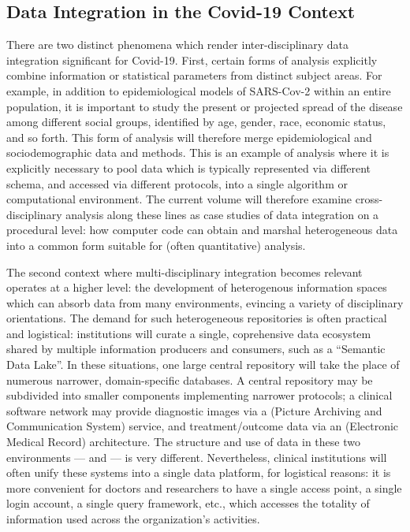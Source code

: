 \documentclass{statsoc}
\newcommand{\p}[1]{

\vspace{.75em}#1}
\newcommand{\textscc}[1]{{\color{orr!35!black}{{%
						\fontfamily{Cabin-TLF}\fontseries{b}\selectfont{\textsc{\scriptsize{#1}}}}}}}
\newcommand{\AcronymText}[1]{{\textscc{#1}}}
\newcommand{\q}[1]{{\fontfamily{qcr}\selectfont ``}#1{\fontfamily{qcr}\selectfont ''}}
\newcommand{\PACS}{\resizebox{!}{7pt}{\AcronymText{PACS}}}
\newcommand{\EMR}{\resizebox{!}{7pt}{\AcronymText{PACS}}}
\begin{document}
\subsection{Data Integration in the Covid-19 Context}
\p{There are two distinct phenomena which render 
inter-disciplinary data integration significant for 
Covid-19.  First, certain forms of analysis explicitly 
combine information or statistical parameters from 
distinct subject areas.  For example, in addition 
to epidemiological models of SARS-Cov-2 within an 
entire population, it is important to study the 
present or projected spread of the disease among 
different social groups, identified by age, gender, 
race, economic status, and so forth.  This form 
of analysis will therefore merge epidemiological 
and sociodemographic data and methods.  This is an 
example of analysis where it is explicitly necessary 
to pool data which is typically represented 
via different schema, and accessed via different 
protocols, into a single algorithm or computational 
environment.  The current volume will therefore 
examine cross-disciplinary analysis along these 
lines as case studies of data integration on a procedural 
level: how computer code can obtain and marshal heterogeneous 
data into a common form suitable for (often quantitative) analysis.} 
   
\p{The second context where multi-disciplinary integration 
becomes relevant operates at a higher level: the development 
of heterogenous information spaces which can absorb 
data from many environments, evincing a variety of 
disciplinary orientations.  The demand for such heterogeneous 
repositories is often practical and logistical: institutions 
will curate a single, coprehensive data ecosystem shared 
by multiple information producers and consumers, such as 
a \q{Semantic Data Lake}.  In these situations, one 
large central repository will take the place of numerous 
narrower, domain-specific databases.  A central repository 
may be subdivided into smaller components implementing 
narrower protocols; a clinical software network may provide 
diagnostic images via a \PACS{} (Picture Archiving and Communication 
System) service, and treatment/outcome data via an 
\EMR{} (Electronic Medical Record) architecture.  The 
structure and use of data in these two environments 
--- \PACS{} and \EMR{} --- is very different.  Nevertheless, 
clinical institutions will often unify these systems into 
a single data platform, for logistical reasons: it 
is more convenient for doctors and researchers to 
have a single access point, a single login account, 
a single query framework, etc., which accesses the 
totality of information used across the organization's 
activities.}
\end{document}
